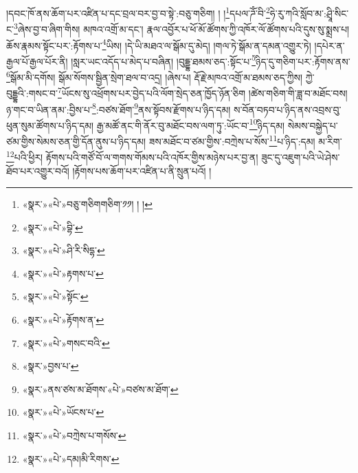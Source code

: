 །དབང་ཁོ་ནས་ཆོག་པར་འཛིན་པ་དང་བྲལ་བར་བྱ་བ་སྟེ་:བཅུ་གཅིག། ། །\footnote{«སྣར་»«པེ་»བཅུ་གཅིགགཅིག་༡༡། ། །}དཔལ་ཌོཾ་བི་\footnote{«སྣར་»«པེ་»བྷི་}ཧེ་རུ་ཀའི་སློབ་མ་:ཤྲཱི་སིང་ང་\footnote{«སྣར་»«པེ་»ཤི་རི་སིདྷ་}ཞེས་བྱ་བ་ཞིག་གིས། མཁའ་འགྲོ་མ་དང་། རྣལ་འབྱོར་པ་ཕོ་མོ་ཚོགས་ཀྱི་འཁོར་ལོ་ཚོགས་པའི་དུས་སུ་སྨྲས་པ། ཆོས་རྣམས་སྟོང་པར་:རྟོགས་པ་\footnote{«སྣར་»«པེ་»རྟགས་པ་}ཡིས། །དེ་ཡི་མཐའ་ལ་སྒོམ་དུ་མེད། །གལ་ཏེ་སྒོམ་ན་དམན་འགྱུར་ཏེ། །དཔེར་ན་རྒྱལ་པོ་རྒྱལ་པོར་ནི། །སླར་ཡང་འདོད་པ་མེད་པ་བཞིན། །བུདྡྷ་ཐམས་ཅད་:སྟོང་པ་\footnote{«སྣར་»«པེ་»སྟོང་}ཉིད་དུ་གཅིག་པར་:རྟོགས་ནས་\footnote{«སྣར་»«པེ་»རྟོགས་ན་}སྒོམ་མི་དགོས། སྒོམ་སོགས་སྦྱིན་སྲེག་ཐལ་བ་འདྲ། །ཞེས་པ། རྡོ་རྗེ་མཁའ་འགྲོ་མ་ཐམས་ཅད་ཀྱིས། ཀྱེ་བུདྡྷའི་:གསང་བ་\footnote{«སྣར་»«པེ་»གསང་བའི་}ཡོངས་སུ་འཕྲོགས་པར་བྱེད་པའི་ལོག་སྲེད་ཅན་ཁྱོད་ཉོན་ཅིག །ཚེས་གཅིག་གི་ཟླ་བ་མཐོང་བས། ཉ་གང་བ་ཡིན་ནམ་:བྱིས་པ་\footnote{«སྣར་»བྱས་པ་}:བཙས་ཐོག་\footnote{«སྣར་»ནས་ཙས་མ་ཐོགས་«པེ་»བཙས་མ་ཐོག་}ནས་སྟོབས་རྫོགས་པ་ཉིད་དམ། ས་བོན་བཏབ་པ་ཉིད་ནས་འབྲས་བུ་ཕུན་སུམ་ཚོགས་པ་ཉིད་དམ། རྒྱ་མཚོ་ནང་གི་ནོར་བུ་མཐོང་བས་ལག་ཏུ་:ཡོང་བ་\footnote{«སྣར་»«པེ་»ཡོངས་པ་}ཉིད་དམ། སེམས་བསྐྱེད་པ་ཙམ་གྱིས་སེམས་ཅན་གྱི་དོན་ནུས་པ་ཉིད་དམ། ཟས་མཐོང་བ་ཙམ་གྱིས་:བཀྲེས་པ་སོས་\footnote{«སྣར་»«པེ་»བཀྲེས་པ་གསོས་}པ་ཉིད་:དམ། མ་རིག་\footnote{«སྣར་»«པེ་»དམ།མི་རིགས་}པའི་ཕྱིར། རྟོགས་པའི་གཙོ་བོ་ལ་གགས་གོམས་པའི་འཁོར་གྱིས་མཉེས་པར་བྱ་ན། ཟུང་དུ་འཇུག་པའི་ཡེ་ཤེས་ཐོབ་པར་འགྱུར་བའོ། །རྟོགས་པས་ཆོག་པར་འཛིན་པ་ནི་སྲུན་པའོ། །

